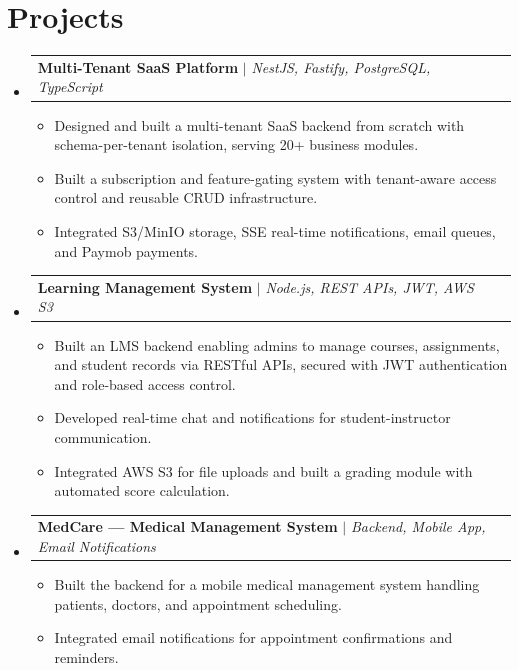 \documentclass[a4paper,11pt]{article}
\makeatletter
\newcommand{\resumeItem}[1]{
  \item\small{
    {#1 \vspace{-2pt}}
  }
}
\newcommand{\resumeProjectHeading}[2]{
    \item
    \begin{tabular*}{0.97\textwidth}{l@{\extracolsep{\fill}}r}
      \small#1 & #2 \\
    \end{tabular*}\vspace{-7pt}
}
\newcommand{\resumeSubHeadingListStart}{\begin{itemize}[leftmargin=0.15in, label={}]}
\newcommand{\resumeSubHeadingListEnd}{\end{itemize}}
\newcommand{\resumeItemListStart}{\begin{itemize}}
\newcommand{\resumeItemListEnd}{\end{itemize}\vspace{-5pt}}
\makeatother
\begin{document}
\section{Projects}
  \resumeSubHeadingListStart
    \resumeProjectHeading
      {\textbf{Multi-Tenant SaaS Platform} $|$ \emph{NestJS, Fastify, PostgreSQL, TypeScript}}{}
      \resumeItemListStart
        \resumeItem{Designed and built a multi-tenant SaaS backend from scratch with schema-per-tenant isolation, serving 20+ business modules.}
        \resumeItem{Built a subscription and feature-gating system with tenant-aware access control and reusable CRUD infrastructure.}
        \resumeItem{Integrated S3/MinIO storage, SSE real-time notifications, email queues, and Paymob payments.}
      \resumeItemListEnd

    \resumeProjectHeading
      {\textbf{Learning Management System} $|$ \emph{Node.js, REST APIs, JWT, AWS S3}}{}
      \resumeItemListStart
        \resumeItem{Built an LMS backend enabling admins to manage courses, assignments, and student records via RESTful APIs, secured with JWT authentication and role-based access control.}
        \resumeItem{Developed real-time chat and notifications for student-instructor communication.}
        \resumeItem{Integrated AWS S3 for file uploads and built a grading module with automated score calculation.}
      \resumeItemListEnd

    \resumeProjectHeading
      {\textbf{MedCare --- Medical Management System} $|$ \emph{Backend, Mobile App, Email Notifications}}{}
      \resumeItemListStart
        \resumeItem{Built the backend for a mobile medical management system handling patients, doctors, and appointment scheduling.}
        \resumeItem{Integrated email notifications for appointment confirmations and reminders.}
      \resumeItemListEnd
  \resumeSubHeadingListEnd


\end{document}
